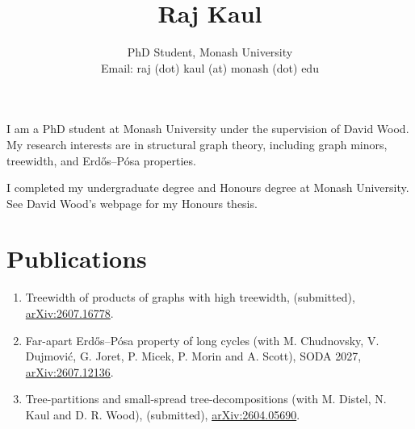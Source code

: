 \documentclass{article}
\title{Raj Kaul}
\author{PhD Student, Monash University\\
Email: raj (dot) kaul (at) monash (dot) edu}
\date{}
\begin{document}
\maketitle

I am a PhD student at Monash University under the supervision of David Wood. My research interests are in structural graph theory, including graph minors, treewidth, and Erdős–Pósa properties.

I completed my undergraduate degree and Honours degree at Monash University. See David Wood's webpage for my Honours thesis.

\section*{Publications}

\begin{enumerate}
\item Treewidth of products of graphs with high treewidth, (submitted), \href{https://doi.org/10.48550/arXiv.2607.16778}{arXiv:2607.16778}.

\item Far-apart Erdős–Pósa property of long cycles (with M. Chudnovsky, V. Dujmović, G. Joret, P. Micek, P. Morin and A. Scott), SODA 2027, \href{https://doi.org/10.48550/arXiv.2607.12136}{arXiv:2607.12136}.

\item Tree-partitions and small-spread tree-decompositions (with M. Distel, N. Kaul and D. R. Wood), (submitted), \href{https://doi.org/10.48550/arXiv.2604.05690}{arXiv:2604.05690}.
\end{enumerate}
\end{document}
